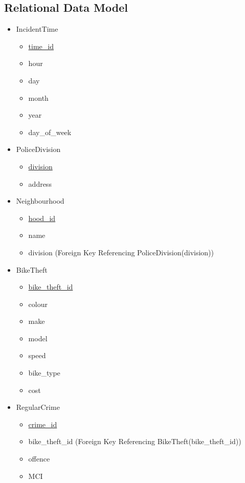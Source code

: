 \documentclass[12pt, a4paper]{article}
\begin{document}
\subsection*{Relational Data Model}
\begin{itemize}
    \item IncidentTime
    \begin{itemize}
        \item \underline{time\_id}
        \item hour
        \item day
        \item month
        \item year 
        \item day\_of\_week
    \end{itemize}
    \item PoliceDivision
        \begin{itemize}
        \item \underline{division}
        \item address
    \end{itemize}
    \item Neighbourhood
        \begin{itemize}
        \item \underline{hood\_id}
        \item name
        \item division (Foreign Key Referencing PoliceDivision(division))
    \end{itemize}
    \item BikeTheft
        \begin{itemize}
        \item \underline{bike\_theft\_id}
        \item colour
        \item make
        \item model
        \item speed
        \item bike\_type
        \item cost
    \end{itemize}
    \item RegularCrime
        \begin{itemize}
        \item \underline{crime\_id}
        \item bike\_theft\_id (Foreign Key Referencing BikeTheft(bike\_theft\_id))
        \item offence
        \item MCI

\end{itemize}
\end{itemize}
\end{document}
